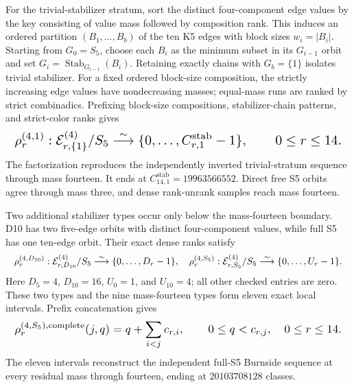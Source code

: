 \documentclass{article}
\newcommand{\fitmath}[1]{\resizebox{0.99\linewidth}{!}{$\displaystyle #1$}}
\begin{document}
For the trivial-stabilizer stratum, sort the distinct four-component edge
values by the key consisting of value mass followed by composition rank. This
induces an ordered partition $(B_1,\ldots,B_b)$ of the ten K5 edges with block
sizes $w_i=|B_i|$. Starting from $G_0=S_5$, choose each $B_i$ as the minimum
subset in its $G_{i-1}$ orbit and set
$G_i=\operatorname{Stab}_{G_{i-1}}(B_i)$. Retaining exactly chains with
$G_b=\{1\}$ isolates trivial stabilizer. For a fixed ordered block-size
composition, the strictly increasing edge values have nondecreasing masses;
equal-mass runs are ranked by strict combinadics. Prefixing block-size
compositions, stabilizer-chain patterns, and strict-color ranks gives
\begin{equation}
  \fitmath{%
    \rho^{(4,1)}_r:
      \mathcal E_{r,\{1\}}^{(4)}/S_5
      \overset{\sim}{\longrightarrow}
      \{0,\ldots,C_{r,1}^{\mathrm{stab}}-1\},
    \qquad 0\leq r\leq14.
  }
  \label{eq:optimization-crazy-sextuple-s6-s5-trivial-ranking}
\end{equation}
The factorization reproduces the independently inverted trivial-stratum
sequence through mass fourteen. It ends at
$C_{14,1}^{\mathrm{stab}}=19963566552$. Direct free S5 orbits agree through mass
three, and dense rank-unrank samples reach mass fourteen.

Two additional stabilizer types occur only below the mass-fourteen boundary.
D10 has two five-edge orbits with distinct four-component values, while full S5
has one ten-edge orbit. Their exact dense ranks satisfy
\begin{equation}
  \fitmath{%
    \rho_r^{(4,D_{10})}:\mathcal E_{r,D_{10}}^{(4)}/S_5
      \overset{\sim}{\longrightarrow}\{0,\ldots,D_r-1\},
    \quad
    \rho_r^{(4,S_5)}:\mathcal E_{r,S_5}^{(4)}/S_5
      \overset{\sim}{\longrightarrow}\{0,\ldots,U_r-1\}.
  }
  \label{eq:optimization-crazy-sextuple-s6-s5-low-mass-exception-ranking}
\end{equation}
Here $D_5=4$, $D_{10}=16$, $U_0=1$, and $U_{10}=4$; all other checked entries
are zero. These two types and the nine mass-fourteen types form eleven exact
local intervals. Prefix concatenation gives
\begin{equation}
  \fitmath{%
    \rho_r^{(4,S_5),\mathrm{complete}}(j,q)
      =q+\sum_{i<j}c_{r,i},
    \qquad 0\leq q<c_{r,j},\quad 0\leq r\leq14.
  }
  \label{eq:optimization-crazy-sextuple-s6-s5-complete-ranking}
\end{equation}
The eleven intervals reconstruct the independent full-S5 Burnside sequence at
every residual mass through fourteen, ending at $20103708128$ classes.
\end{document}

